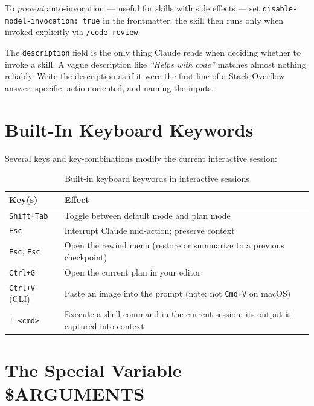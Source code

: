 To \emph{prevent} auto-invocation — useful for skills with side effects —
set \texttt{disable-model-invocation: true} in the frontmatter; the skill
then runs only when invoked explicitly via \texttt{/code-review}.

\begin{warningbox}
The \texttt{description} field is the only thing Claude reads when deciding
whether to invoke a skill. A vague description like
\emph{``Helps with code''} matches almost nothing reliably. Write the
description as if it were the first line of a Stack Overflow answer:
specific, action-oriented, and naming the inputs.
\end{warningbox}

\section{Built-In Keyboard Keywords}
\label{sec:builtin-keys}


Several keys and key-combinations modify the current interactive session:

\begin{table}[ht]
\centering
\caption{Built-in keyboard keywords in interactive sessions}
\label{tab:built-in-keys}
\begin{tabularx}{\textwidth}{lX}
\toprule
\textbf{Key(s)} & \textbf{Effect} \\
\midrule
\texttt{Shift+Tab}   & Toggle between default mode and plan mode \\
\texttt{Esc}         & Interrupt Claude mid-action; preserve context \\
\texttt{Esc}, \texttt{Esc}
                     & Open the rewind menu (restore or summarize to a previous checkpoint) \\
\texttt{Ctrl+G}      & Open the current plan in your editor \\
\texttt{Ctrl+V} (CLI)& Paste an image into the prompt
                       (note: not \texttt{Cmd+V} on macOS) \\
\texttt{!\,<cmd>}    & Execute a shell command in the current session;
                       its output is captured into context \\
\bottomrule
\end{tabularx}
\end{table}

\section{The Special Variable \$ARGUMENTS}
\label{sec:arguments-variable}

